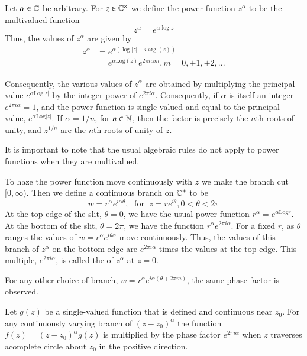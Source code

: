\documentclass[12pt, a4paper, oneside, openright, titlepage]{book}
\begin{document}
\begin{defn}
    Let $\alpha \in \mathbb C$ be arbitrary. For $z \in \mathbb C^{\times}$ we define the power function $z^{\alpha}$ to be the multivalued function \begin{equation*}
        z^{\alpha} = e^{\alpha\log z}
    \end{equation*}
    Thus, the values of $z^{\alpha}$ are given by \begin{align*}
        z^{\alpha} &= e^{\alpha(\log|z| +i\arg(z))} \\
        &= e^{\alpha\text{Log}(z)}e^{2\pi i\alpha m}, m = 0, \pm 1,\pm 2,...
    \end{align*}
\end{defn}

Consequently, the various values of $z^{\alpha}$ are obtained by multiplying the principal value $e^{\alpha\text{Log}|z|}$ by the integer power of $e^{2\pi i\alpha}$. Consequently, if $\alpha$ is itself an integer $e^{2\pi i\alpha} = 1$, and the power function is single valued and equal to the principal value, $e^{\alpha\text{Log}|z|}$. If $\alpha = 1/n$, for $n \in \mathbb N$, then the factor is precisely the $n$th roots of unity, and $z^{1/n}$ are the $n$th roots of unity of $z$.

It is important to note that the usual algebraic rules do not apply to power functions when they are multivalued. 

To haze the power function move continuously with $z$ we make the branch cut $[0,\infty)$. Then we define a continuous branch on $\mathbb C^+$ to be \begin{equation*}
    w = r^{\alpha}e^{i\alpha \theta},\; \text{ for }\;z = re^{i\theta}, 0<\theta < 2\pi
\end{equation*}
At the top edge of the slit, $\theta = 0$, we have the usual power function $r^{\alpha} = e^{\alpha\text{Log}r}$. At the bottom of the slit, $\theta = 2\pi$, we have the function $r^{\alpha}e^{2\pi i\alpha}$. For a fixed $r$, as $\theta$ ranges the values of $w= r^{\alpha}e^{i\theta\alpha}$ move continuously. Thus, the values of this branch of $z^{\alpha}$ on the bottom edge are $e^{2\pi i\alpha}$ times the values at the top edge. This multiple, $e^{2\pi i\alpha}$, is called the  of $z^{\alpha}$ at $z = 0$. 

For any other choice of branch, $w=r^{\alpha}e^{i\alpha(\theta+2\pi m)}$, the same phase factor is observed. 

\begin{lem}\label{lem:phasechange}
    Let $g(z)$ be a single-valued function that is defined and continuous near $z_0$. For any continuously varying branch of $(z-z_0)^{\alpha}$ the function $f(z) = (z-z_0)^{\alpha}g(z)$ is multiplied by the phase factor $e^{2\pi i \alpha}$ when $z$ traverses acomplete circle about $z_0$ in the positive direction.
\end{lem}
\end{document}
